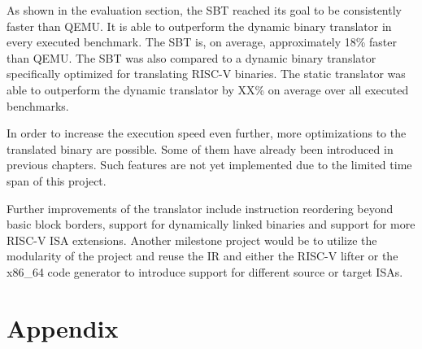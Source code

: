 \documentclass[course=eragp]{aspdoc}
\begin{document}
\par

As shown in the evaluation section, the SBT reached its goal to be consistently faster than QEMU. It is able to outperform
the dynamic binary translator in every executed benchmark. The SBT is, on average, approximately
18\% faster than QEMU. The SBT was also compared to a dynamic binary translator specifically
optimized for translating RISC-V binaries. The static translator
was able to outperform the dynamic translator by XX\% on average over all executed benchmarks.

\par

In order to increase the execution speed even further,
more optimizations to the translated binary are possible. Some of them have
already been introduced in previous chapters. Such features are not yet implemented due to the
limited time span of this project.

\par

Further improvements of the translator include instruction reordering beyond basic block borders,
support for dynamically linked binaries and support for more RISC-V ISA extensions. Another milestone project would
be to utilize the modularity of the project and reuse the IR and either the RISC-V lifter or the
x86\_64 code generator to introduce support for different source or target ISAs.


\clearpage


{}

\appendix
\section{Appendix}
\end{document}
